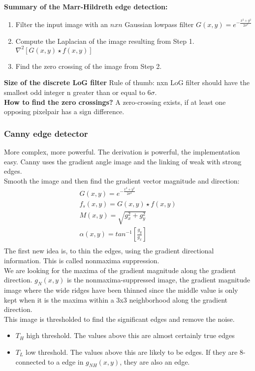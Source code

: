 \textbf{Summary of the Marr-Hildreth edge detection:}
\begin{enumerate}
\item Filter the input image with an $n x n$ Gaussian lowpass filter $G(x,y)=e^{-\frac{x^2+y^2}{2\sigma^2}}$
\item Compute the Laplacian of the image resulting from Step 1. $\nabla ^2[G(x,y) \star f(x,y)]$
\item Find the zero crossing of the image from Step 2.
\end{enumerate}
\textbf{Size of the discrete LoG filter}
Rule of thumb: nxn LoG filter should have the smallest odd integer n greater than or equal to $6\sigma$.\\
\textbf{How to find the zero crossings?}
A zero-crossing exists, if at least one opposing pixelpair has a sign difference.

\subsubsection{Canny edge detector}
More complex, more powerful. The derivation is powerful, the implementation easy. Canny uses the gradient angle image and the linking of weak with strong edges.\\
Smooth the image and then find the gradient vector magnitude and direction:
\begin{align*}
G(x,y) = e^{-\frac{x^2+y^2}{2\sigma^2}}\\
f_s(x,y)=G(x,y)\star f(x,y)\\
M(x,y) = \sqrt{g_x^2+g_y^2}\\
\alpha(x,y) = tan^{-1}\left[\frac{g_y}{g_x}\right]\\
\end{align*}
The first new idea is, to thin the edges, using the gradient directional information. This is called nonmaxima suppression.\\
We are looking for the maxima of the gradient magnitude along the gradient direction. $g_N(x,y)$ is the nonmaxima-suppressed image, the gradient magnitude image where the wide ridges have been thinned since the middle value is only kept when it is the maxima within a 3x3 neighborhood along the gradient direction.\\
This image is thresholded to find the significant edges and remove the noise.

\begin{itemize}
\item $T_H$ high threshold. The values above this are almost certainly true edges
\item $T_L$ low threshold. The values above this are likely to be edges. If they are 8-connected to a edge in $g_{NH}(x,y)$, they are also an edge.
\end{itemize}

